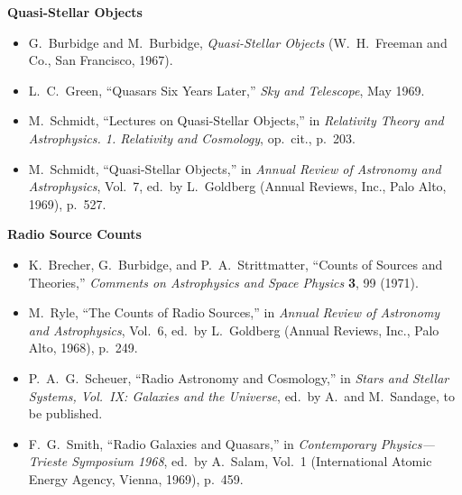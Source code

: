 \medskip
\noindent\textbf{Quasi-Stellar Objects}\par
\begin{itemize}
  \item[\(\square\)] G.~Burbidge and M.~Burbidge,
  \emph{Quasi-Stellar Objects}
  (W.~H.~Freeman and Co., San Francisco, 1967).

  \item[\(\square\)] L.~C.~Green,
  ``Quasars Six Years Later,'' \emph{Sky and Telescope}, May 1969.

  \item[\(\square\)] M.~Schmidt,
  ``Lectures on Quasi-Stellar Objects,'' in
  \emph{Relativity Theory and Astrophysics. 1. Relativity and Cosmology},
  op.\ cit., p.~203.

  \item[\(\square\)] M.~Schmidt,
  ``Quasi-Stellar Objects,'' in
  \emph{Annual Review of Astronomy and Astrophysics}, Vol.~7,
  ed.\ by L.~Goldberg (Annual Reviews, Inc., Palo Alto, 1969), p.~527.
\end{itemize}

\medskip
\noindent\textbf{Radio Source Counts}\par
\begin{itemize}
  \item[\(\square\)] K.~Brecher, G.~Burbidge, and P.~A.~Strittmatter,
  ``Counts of Sources and Theories,''
  \emph{Comments on Astrophysics and Space Physics} \textbf{3}, 99 (1971).

  \item[\(\square\)] M.~Ryle, ``The Counts of Radio Sources,'' in
  \emph{Annual Review of Astronomy and Astrophysics}, Vol.~6,
  ed.\ by L.~Goldberg (Annual Reviews, Inc., Palo Alto, 1968), p.~249.

  \item[\(\square\)] P.~A.~G.~Scheuer,
  ``Radio Astronomy and Cosmology,'' in
  \emph{Stars and Stellar Systems, Vol.\ IX: Galaxies and the Universe},
  ed.\ by A.\ and M.~Sandage, to be published.

  \item[\(\square\)] F.~G.~Smith, ``Radio Galaxies and Quasars,'' in
  \emph{Contemporary Physics---Trieste Symposium 1968},
  ed.\ by A.~Salam, Vol.~1
  (International Atomic Energy Agency, Vienna, 1969), p.~459.
\end{itemize}



